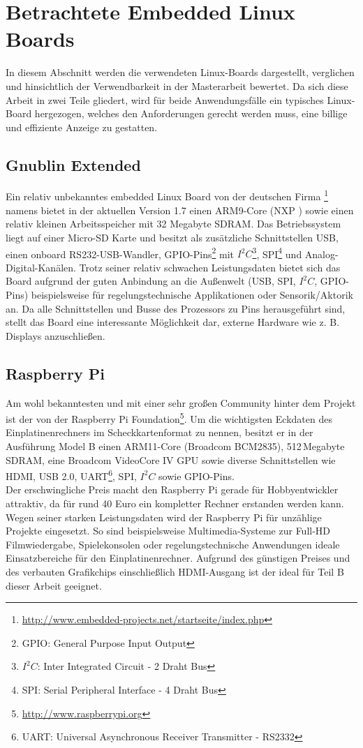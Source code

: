 \section{Betrachtete Embedded Linux Boards}
\label{cha:betrachtete_linux_boards}
In diesem Abschnitt werden die verwendeten Linux-Boards dargestellt, verglichen und hinsichtlich der Verwendbarkeit in der Masterarbeit bewertet. Da sich diese Arbeit in zwei Teile gliedert, wird für beide Anwendungsfälle ein typisches Linux-Board hergezogen, welches den Anforderungen gerecht werden muss, eine billige und effiziente Anzeige zu gestatten.
\subsection{Gnublin Extended}
\label{cha:gnublin_extended}
Ein relativ unbekanntes embedded Linux Board von der deutschen Firma \footnote{\url{http://www.embedded-projects.net/startseite/index.php}} namens  bietet in der aktuellen Version 1.7 einen ARM9-Core (NXP ) sowie einen relativ kleinen Arbeitsspeicher mit 32 Megabyte SDRAM. Das Betriebssystem liegt auf einer Micro-SD Karte und besitzt als zusätzliche Schnittstellen USB, einen onboard RS232-USB-Wandler, GPIO-Pins\footnote{GPIO: General Purpose Input Output} mit $I^2C$\footnote{$I^2C$: Inter Integrated Circuit - 2 Draht Bus}, SPI\footnote{SPI: Serial Peripheral Interface - 4 Draht Bus} und Analog-Digital-Kanälen. Trotz seiner relativ schwachen Leistungsdaten bietet sich das Board aufgrund der guten Anbindung an die Außenwelt (USB, SPI, $I^2C$, GPIO-Pins) beispielsweise für regelungstechnische Applikationen oder Sensorik/Aktorik an.
Da alle Schnittstellen und Busse des Prozessors zu Pins herausgeführt sind, stellt das Board eine interessante Möglichkeit dar, externe Hardware wie z. B. Displays anzuschließen. 
\subsection{Raspberry Pi}
\label{cha:raspberry}
Am wohl bekanntesten und mit einer sehr großen Community hinter dem Projekt ist der  von der Raspberry Pi Foundation\footnote{\url{http://www.raspberrypi.org}}. Um die wichtigsten Eckdaten des Einplatinenrechners im Scheckkartenformat zu nennen, besitzt er in der Ausführung Model B einen ARM11-Core (Broadcom BCM2835), 512\,Megabyte SDRAM, eine Broadcom VideoCore IV GPU sowie diverse Schnittstellen wie HDMI, USB 2.0, UART\footnote{UART: Universal Asynchronous Receiver Transmitter - RS2332}, SPI, $I^2C$ sowie GPIO-Pins.\\
Der erschwingliche Preis macht den Raspberry Pi gerade für Hobbyentwickler attraktiv, da für rund 40 Euro ein kompletter Rechner erstanden werden kann. Wegen seiner starken Leistungsdaten wird der Raspberry Pi für unzählige Projekte eingesetzt. So sind beispielsweise Multimedia-Systeme zur Full-HD Filmwiedergabe, Spielekonsolen oder regelungstechnische Anwendungen ideale Einsatzbereiche für den Einplatinenrechner.
Aufgrund des günstigen Preises und des verbauten Grafikchips einschließlich HDMI-Ausgang ist der  ideal für Teil B dieser Arbeit geeignet.